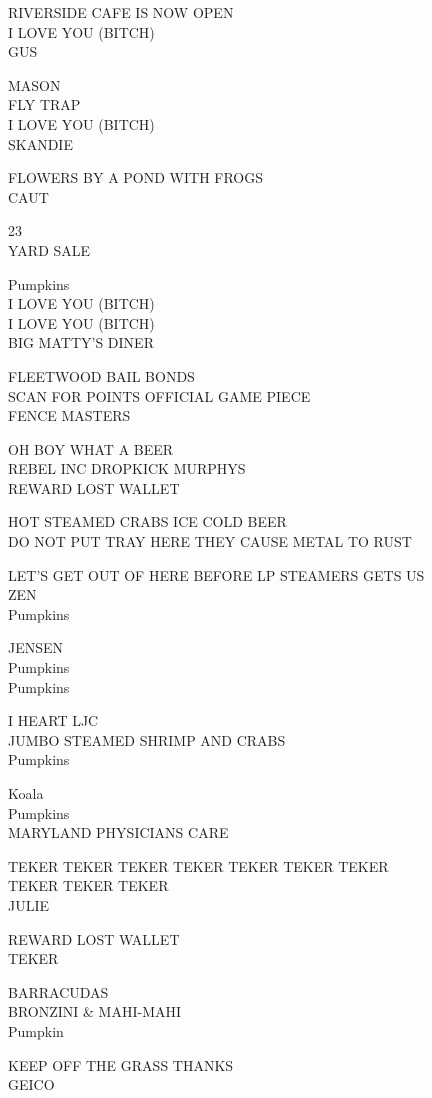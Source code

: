\documentclass[10pt,letterpaper]{article}
\begin{document}
RIVERSIDE CAFE IS NOW OPEN\\
I LOVE YOU (BITCH)\\
GUS

MASON\\
FLY TRAP\\
I LOVE YOU (BITCH)\\
SKANDIE

FLOWERS BY A POND WITH FROGS\\
CAUT

23\\
YARD SALE

Pumpkins\\
I LOVE YOU (BITCH)\\
I LOVE YOU (BITCH)\\
BIG MATTY'S DINER

FLEETWOOD BAIL BONDS\\
SCAN FOR POINTS OFFICIAL GAME PIECE\\
FENCE MASTERS

OH BOY WHAT A BEER\\
REBEL INC DROPKICK MURPHYS\\
REWARD LOST WALLET

HOT STEAMED CRABS ICE COLD BEER\\
DO NOT PUT TRAY HERE THEY CAUSE METAL TO RUST

LET'S GET OUT OF HERE BEFORE LP STEAMERS GETS US\\
ZEN\\
Pumpkins

JENSEN\\
Pumpkins\\
Pumpkins

I HEART LJC\\
JUMBO STEAMED SHRIMP AND CRABS\\
Pumpkins

Koala\\
Pumpkins\\
MARYLAND PHYSICIANS CARE

TEKER TEKER TEKER TEKER TEKER TEKER TEKER\\
TEKER TEKER TEKER\\
JULIE

REWARD LOST WALLET\\
TEKER

BARRACUDAS\\
BRONZINI \& MAHI{-}MAHI\\
Pumpkin

KEEP OFF THE GRASS THANKS\\
GEICO
\end{document}
